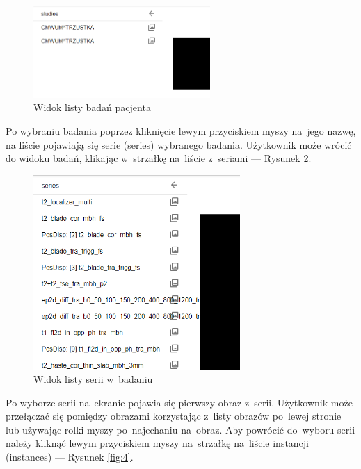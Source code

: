 \documentclass[a4paper,11pt,twoside,openright]{report}
\theoremstyle{definition}
\begin{document}
\begin{enumerate}
\begin{figure}[h!]
	\center
	\includegraphics[width=0.6\textwidth]{2}
	\caption{Widok listy badań pacjenta}
    	\label{fig:2}
\end{figure}

\pagebreak

Po wybraniu badania poprzez kliknięcie lewym przyciskiem myszy na~jego nazwę,
na liście pojawiają się serie (series) wybranego badania. Użytkownik może wrócić
do widoku badań, klikając w~strzałkę na~liście z~seriami --- Rysunek \ref{fig:3}.

\begin{figure}[h!]
	\center
	\includegraphics[width=0.7\textwidth]{3}
	\caption{Widok listy serii w~badaniu}
    	\label{fig:3}
\end{figure}

Po wyborze serii na~ekranie pojawia się pierwszy obraz z~serii. Użytkownik
może przełączać się pomiędzy obrazami korzystając z~listy obrazów po~lewej
stronie lub używając rolki myszy po~najechaniu na~obraz. Aby powrócić do~wyboru
serii należy kliknąć lewym przyciskiem myszy na~strzałkę na~liście instancji
(instances) --- Rysunek \ref{fig:4}.

\pagebreak


\end{enumerate}
\end{document}

